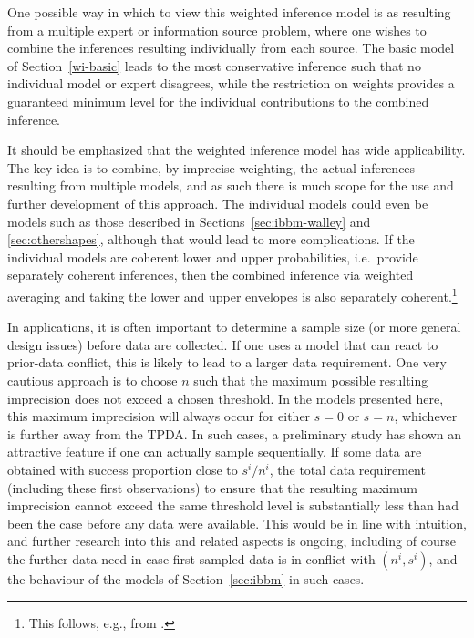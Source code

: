 One possible way in which to view this weighted inference model is
as resulting from a multiple expert or information source problem,
where one wishes to combine the inferences resulting individually
from each source. The basic model of Section~\ref{wi-basic} leads to
the most conservative inference such that no individual model or
expert disagrees, while the restriction on weights provides a
guaranteed minimum level for the individual contributions to the combined
inference.

It should be emphasized that the weighted inference model has wide applicability.
The key idea is to combine,
by imprecise weighting, the actual inferences resulting from
multiple models, and as such there is much scope for the use and
further development of this approach. The individual models could
even be models such as those described in
Sections~\ref{sec:ibbm-walley} and \ref{sec:othershapes}, although
that would lead to more complications. If the individual models
are coherent lower and upper probabilities, i.e.\ provide separately
coherent inferences, then the combined inference via weighted
averaging and taking the lower and upper envelopes is also
separately coherent.\footnote{This follows, e.g., from \textcite[\S 2.6.3f]{1991:walley}.}

In applications, it is often important to determine a sample size
(or more general design issues) before data are collected. If one
uses a model that can react to prior-data conflict, this is likely
to lead to a larger data requirement. One very cautious approach is to choose $n$ such that the maximum possible resulting
imprecision does not exceed a chosen threshold. In the models
presented here, this maximum imprecision will always occur
for either $s=0$ or $s=n$, whichever is further away from the TPDA.
In such cases, a preliminary study has shown an attractive feature if one can actually
sample sequentially. If some data are obtained with success proportion close to $s^i/n^i$, %
the total data requirement (including these first observations) %
to ensure that the resulting maximum
imprecision cannot exceed the same threshold level is substantially less
than had been the case before any data were available.
This would be in line with intuition, and further
research into this and related aspects is ongoing, including of
course the further data need in case first sampled data is in
conflict with $(n^i,s^i)$, and the behaviour of the models of Section~\ref{sec:ibbm} in such cases.

